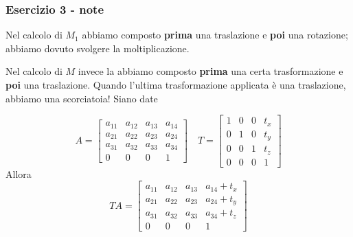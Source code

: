 \documentclass{beamer}
\begin{document}
\begin{frame}
\frametitle{Esercizio 3 - note}
    Nel calcolo di $M_1$ abbiamo composto \textbf{prima} una traslazione e \textbf{poi} una rotazione;
    abbiamo dovuto svolgere la moltiplicazione.
    
    Nel calcolo di $M$ invece la abbiamo composto \textbf{prima} una certa trasformazione e \textbf{poi} una traslazione.
    Quando l'ultima trasformazione applicata \`e una traslazione, abbiamo una scorciatoia! Siano date

\begin{displaymath}
    A = 
\begin{bmatrix}
    a_{11} & a_{12} & a_{13} & a_{14} \\
a_{21} & a_{22} & a_{23} & a_{24} \\
a_{31} & a_{32} & a_{33} & a_{34} \\
0      &    0   &  0     & 1 
\end{bmatrix}
    \quad
    T = 
\begin{bmatrix}
    1 & 0 & 0 & t_x \\
    0 & 1 & 0 & t_y \\
    0 & 0 & 1 & t_z \\
0      &    0   &  0     & 1 
\end{bmatrix}
\end{displaymath}
Allora
\begin{displaymath}
T A
    =  
\begin{bmatrix}
a_{11} & a_{12} & a_{13} & a_{14} + t_x\\
a_{21} & a_{22} & a_{23} & a_{24} + t_y\\
a_{31} & a_{32} & a_{33} & a_{34} + t_z\\
0      &    0   &  0     & 1 
\end{bmatrix}
\end{displaymath}

\end{frame}
\end{document}
